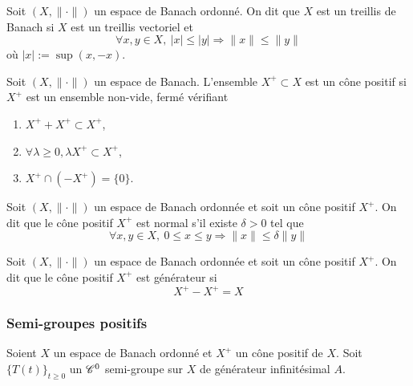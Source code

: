 \begin{definition}
    Soit $(X,\|\cdot\|)$ un espace de Banach ordonné. On dit que $X$ est un \textcolor{astral}{treillis de Banach} si $X$ est un treillis vectoriel et 
    \begin{equation*}
        \forall x,y \in X, \ |x| \leq |y| \Longrightarrow \|x\| \leq \|y\|
    \end{equation*}
    où $|x|:=\sup(x,-x)$.
\end{definition}

\begin{definition}
    Soit $(X,\|\cdot\|)$ un espace de Banach. L'ensemble $X^+ \subset X$ est un \textcolor{astral}{cône positif} si $X^+$ est un ensemble non-vide, fermé vérifiant 
    \begin{enumerate}
        \item $X^++X^+ \subset X^+$,
        \item $\forall \lambda \geq 0, \lambda X^+ \subset X^+$,
        \item $X^+ \cap (-X^+) = \{0\}$.
    \end{enumerate} 
\end{definition}

\begin{definition}
    Soit $(X,\|\cdot\|)$ un espace de Banach ordonnée et soit un cône positif $X^+$. On dit que le cône positif $X^+$ est \textcolor{astral}{normal} s'il existe $\delta >0$ tel que 
    \begin{equation*}
        \forall x,y \in X, \ 0 \leq x \leq y \Longrightarrow \|x\| \leq \delta \|y\|
    \end{equation*}
\end{definition}

\begin{definition}
    Soit $(X,\|\cdot\|)$ un espace de Banach ordonnée et soit un cône positif $X^+$. On dit que le cône positif $X^+$ est \textcolor{astral}{générateur} si 
    \begin{equation*}
        X^+ - X^+ = X
    \end{equation*}
\end{definition}

\subsubsection{Semi-groupes positifs}
Soient $X$ un espace de Banach ordonné et $X^+$ un cône positif de $X$. Soit $\big\{T(t)\big\}_{t \geq 0}$ un $\mathscr{C}^0$ semi-groupe sur $X$ de générateur infinitésimal $A$.

